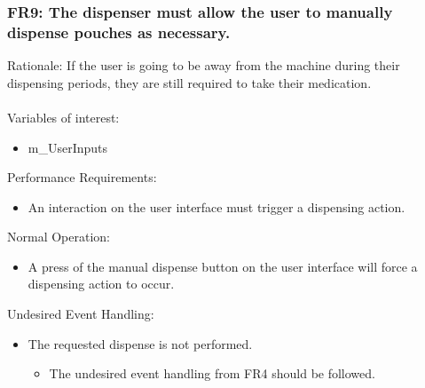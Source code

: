 \documentclass[12pt]{article}
\begin{document}
\subsubsection*{FR9: The dispenser must allow the user to manually dispense pouches as necessary.}
Rationale: If the user is going to be away from the machine during their dispensing periods, they are still required to take their medication.
\\\\
Variables of interest:
\begin{itemize}[noitemsep,topsep=0pt]
    \item m\_UserInputs
\end{itemize} 
\bigskip
Performance Requirements:
\begin{itemize}[noitemsep,topsep=0pt]
    \item An interaction on the user interface must trigger a dispensing action.
\end{itemize}
\bigskip
Normal Operation:
\begin{itemize}[noitemsep,topsep=0pt]
    \item A press of the manual dispense button on the user interface will force a dispensing action to occur.
\end{itemize}
\bigskip
Undesired Event Handling:
\begin{itemize}[noitemsep,topsep=0pt]
    \item The requested dispense is not performed.
    \begin{itemize}
        \item The undesired event handling from FR4 should be followed.
    \end{itemize}
\end{itemize}
\bigskip


\end{document}
